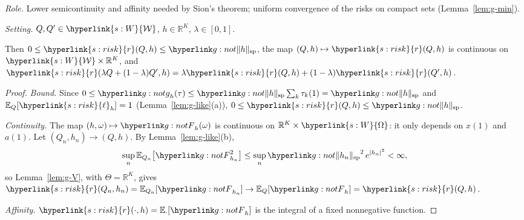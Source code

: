 \documentclass[11pt]{article}
\DeclareRobustCommand{\sy}[2]{{\hyperlink{#1}{#2}}}
\newcommand{\R}{\mathbb{R}}
\newcommand{\E}{\mathbb{E}}
\newcommand{\1}{\mathbf{1}}
\newcommand{\Wc}{\sy{s:W}{\mathcal W}}
\newcommand{\Om}{\sy{s:W}{\Omega}}
\newcommand{\rk}{\sy{s:risk}{r}}
\newcommand{\lh}{\sy{s:risk}{\ell}}
\begin{document}
\begin{lemma}\label{lem:g-cont}
\textit{Role.} Lower semicontinuity and affinity needed by Sion's theorem; uniform convergence of the risks on compact sets (Lemma~\ref{lem:g-min}).

\noindent\textit{Setting.} $Q,Q'\in\Wc$, $h\in\R^K$, $\lambda\in[0,1]$.

\noindent Then $0\le\rk(Q,h)\le\gsp h$, the map $(Q,h)\mapsto\rk(Q,h)$ is continuous on $\Wc\times\R^K$, and
$\rk(\lambda Q+(1-\lambda)Q',h)=\lambda\rk(Q,h)+(1-\lambda)\rk(Q',h)$.
\end{lemma}
\begin{proof}
\textit{Bound.} Since $0\le\ggh_h(\tau)\le\gsp h\sum_k\tau_k(1)=\gsp h$ and $\E_Q[\lh_h]=1$ (Lemma~\ref{lem:g-like}(a)), $0\le\rk(Q,h)\le\gsp h$.

\textit{Continuity.} The map $(h,\omega)\mapsto\gFh_h(\omega)$ is continuous on $\R^K\times\Om$: it only depends on $x(1)$ and $a(1)$. Let $(Q_n,h_n)\to(Q,h)$. By
Lemma~\ref{lem:g-like}(b),
\[
\sup_n\E_{Q_n}\big[\gFh_{h_n}^2\big]\le\sup_n\gsp{h_n}^2\,e^{|h_n|^2}<\infty,
\]
so Lemma~\ref{lem:g-V}, with $\Theta=\R^K$, gives $\rk(Q_n,h_n)=\E_{Q_n}[\gFh_{h_n}]\to\E_Q[\gFh_h]=\rk(Q,h)$.

\textit{Affinity.} $\rk(\cdot,h)=\E_\cdot[\gFh_h]$ is the integral of a fixed nonnegative function.
\end{proof}
\end{document}
